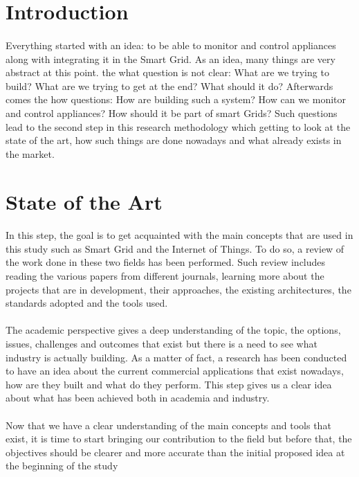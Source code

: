 \documentclass[12pt,a4paper,final]{report}
\begin{document}
\section{Introduction}
\paragraph{}
Everything started with an idea: to be able to monitor and control appliances along with integrating it in the Smart Grid. As an idea, many things are very abstract at this point. the what question is not clear: What are we trying to build? What are we trying to get at the end? What should it do? Afterwards comes the how questions: How are building such a system? How can we monitor and control appliances? How should it be part of smart Grids? Such questions lead to the second step in this research methodology which getting to look at the state of the art, how such things are done nowadays and what already exists in the market.

\section{State of the Art}
\paragraph{}
In this step, the goal is to get acquainted with the main concepts that are used in this study such as Smart Grid and the Internet of Things. To do so, a review of the work done in these two fields has been performed. Such review includes reading the various papers from different journals, learning more about the projects that are in development, their approaches, the existing architectures, the standards adopted and the tools used.
\paragraph{}
The academic perspective gives a deep understanding of the topic, the options, issues, challenges and outcomes that exist but there is a need to see what industry is actually building. As a matter of fact, a research has been conducted to have an idea about the current commercial applications that exist nowadays, how are they built and what do they perform. This step gives us a clear idea about what has been achieved both in academia and industry.
\paragraph{}
Now that we have a clear understanding of the main concepts and tools that exist, it is time to start bringing our contribution to the field but before that, the objectives should be clearer and more accurate than the initial proposed idea at the beginning of the study
\end{document}
